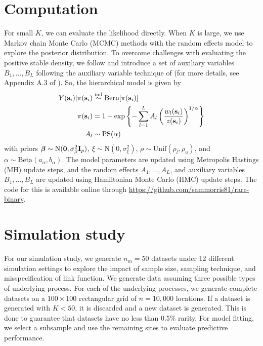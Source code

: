 \section{Computation}\label{rbs:comp}
For small $K$, we can evaluate the likelihood directly.
When $K$ is large, we use Markov chain Monte Carlo (MCMC) methods with the random effects model to explore the posterior distribution.
To overcome challenges with evaluating the positive stable density, we follow \citet{Reich2012} and introduce a set of auxiliary variables $B_1, \ldots, B_L$ following the auxiliary variable technique of \citet{Stephenson2009} (for more details, see Appendix A.3 of \citet{Reich2012}).
So, the hierarchical model is given by
\begin{align}
  Y(\mathbf{s}_i) | \pi(\mathbf{s}_i) &\stackrel{\mathrm{ind}}{\sim} \text{Bern}[\pi(\mathbf{s}_i)] \\
    \pi(\mathbf{s}_i) &= 1 - \exp \left\{ -\displaystyle \sum_{ l = 1 }^{L} A_l \left( \frac{ w_{l}(\mathbf{s}_i) }{ z(\mathbf{s}_i) } \right)^{ 1/\alpha} \right\} \nonumber\\
    A_l &\sim \text{PS}(\alpha) \nonumber
\end{align}
with priors $\mbox{\boldmath $\beta$} \sim \text{N}(\mathbf{0}, \sigma^2_\beta \mathbf{I}_p )$, $\xi \sim \text{N}(0, \sigma^2_\xi)$, $\rho \sim \text{Unif}(\rho_l, \rho_u)$, and $\alpha \sim \text{Beta}(a_\alpha, b_\alpha)$.
The model parameters are updated using Metropolis Hastings (MH) update steps, and the random effects $A_1, \ldots, A_L$, and auxiliary variables $B_1, \ldots, B_L$ are updated using Hamiltonian Monte Carlo (HMC) update steps.
The code for this is available online through \url{https://github.com/sammorris81/rare-binary}.

\section{Simulation study}\label{rbs:sim}

For our simulation study, we generate $n_m = 50$ datasets under 12 different simulation settings to explore the impact of sample size, sampling technique, and misspecification of link function.
We generate data assuming three possible types of underlying process.
For each of the underlying processes, we generate complete datasets on a $100 \times 100$ rectangular grid of $n = 10,000$ locations.
If a dataset is generated with $K < 50$, it is discarded and a new dataset is generated.
This is done to guarantee that datasets have no less than $0.5\%$ rarity.
For model fitting, we select a subsample and use the remaining sites to evaluate predictive performance.

